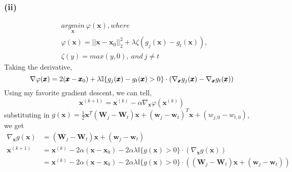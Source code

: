 \documentclass[11pt]{article}
\begin{document}
\subsubsection*{(ii)}
\begin{equation}
\begin{split}
&\underset{\pmb{x}}{argmin}\ \varphi(\pmb{x}), where\\
&\varphi(\pmb{x})=||\pmb{x}-\pmb{x}_0||^2_2+\lambda\zeta(g_j(\pmb{x})-g_t(\pmb{x})),\\
&\zeta(y)=max(y,0),\ and\ j\ne t
\end{split}
\end{equation}
Taking the derivative,
\begin{equation}
\nabla \varphi(\pmb{x}) = 2(\pmb{x}-\pmb{x}_0)+\lambda\mathbb{I}\{g_j(\pmb{x})-g_t(\pmb{x}) > 0\}\cdot(\nabla_{\pmb{x}}g_j(\pmb{x})-\nabla_{\pmb{x}}g_t(\pmb{x}))\\
\end{equation}
Using my favorite gradient descent, we can tell,
\begin{equation}
\pmb{x}^{(k+1)}=\pmb{x}^{(k)}-\alpha\nabla_{\pmb{x}}\varphi(\pmb{x}^{(k)})
\end{equation}
substituting in $g(\pmb{x})=\frac{1}{2}\pmb{x}^T(\pmb{W}_j-\pmb{W}_t)\pmb{x}+(\pmb{w}_j-\pmb{w}_t)^T\pmb{x}+(w_{j,0}-w_{t,0})$,
we get 
\begin{equation}
\begin{split}
\nabla_{\pmb{x}}g(\pmb{x})&=(\pmb{W}_j-\pmb{W}_t)\pmb{x}+(\pmb{w}_j-\pmb{w}_t)\\
\pmb{x}^{(k+1)}&=\pmb{x}^{(k)}-2\alpha(\pmb{x}-\pmb{x}_0)-2\alpha\lambda\mathbb{I}\{g(\pmb{x}) > 0\}\cdot(\nabla_{\pmb{x}}g(\pmb{x}))\\
&=\pmb{x}^{(k)}-2\alpha(\pmb{x}-\pmb{x}_0)-2\alpha\lambda\mathbb{I}\{g(\pmb{x}) > 0\}\cdot((\pmb{W}_j-\pmb{W}_t)\pmb{x}+(\pmb{w}_j-\pmb{w}_t))
\end{split}
\end{equation}
\end{document}

